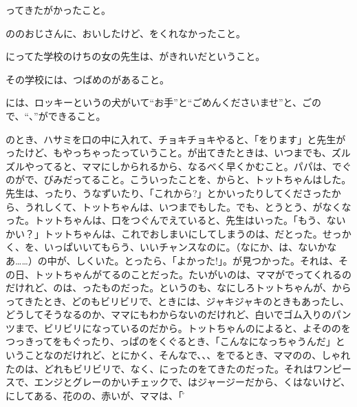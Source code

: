 ってきたがかったこと。

ののおじさんに、おいしたけど、をくれなかったこと。

にってた学校のけちの女の先生は、がきれいだということ。

その学校には、つばめのがあること。

には、ロッキーというの犬がいて“お手”と“ごめんくださいませ”と、ごので、“、”ができること。

のとき、ハサミを口の中に入れて、チョキチョキやると、「をります」と先生がったけど、もやっちゃったっていうこと。が出てきたときは、いつまでも、ズルズルやってると、ママにしかられるから、なるべく早くかむこと。パパは、でぐのがで、びみだってること。こういったことを、からと、トットちゃんはした。先生は、ったり、うなずいたり、「これから?」とかいったりしてくださったから、うれしくて、トットちゃんは、いつまでもした。でも、とうとう、がなくなった。トットちゃんは、口をつぐんでえていると、先生はいった。「もう、ないかい？」トットちゃんは、これでおしまいにしてしまうのは、だとった。せっかく、を、いっぱいいてもらう、いいチャンスなのに。（なにか、は、ないかなあ……）の中が、しくいた。とったら、「よかった!」。が見つかった。それは、その日、トットちゃんがてるのことだった。たいがいのは、ママがでってくれるのだけれど、のは、ったものだった。というのも、なにしろトットちゃんが、からってきたとき、どのもビリビリで、ときには、ジャキジャキのときもあったし、どうしてそうなるのか、ママにもわからないのだけれど、白いでゴム入りのパンツまで、ビリビリになっているのだから。トットちゃんのによると、よそののをつっきってをもぐったり、っぱのをくぐるとき、「こんなになっちゃうんだ」ということなのだけれど、とにかく、そんなで、、、をでるとき、ママのの、しゃれたのは、どれもビリビリで、なく、にったのをてきたのだった。それはワンピースで、エンジとグレーのかいチェックで、はジャージーだから、くはないけど、にしてある、花のの、赤いが、ママは、「が\r